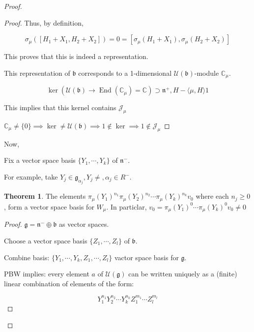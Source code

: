 \documentclass{article}
\theoremstyle{definition}
\newtheorem{theorem}{Theorem}
\begin{document}
\begin{proof}
\begin{proof}
        Thus, by definition,

        \[
            \sigma_\mu ([H_1 + X_1, H_2 + X_2]) = 0 = [\sigma_\mu(H_1 + X_1), \sigma_\mu(H_2 + X_2)]
        \]

        This proves that this is indeed a representation.

        This representation of \(\mathfrak{b}\) corresponds to a 1-dimensional \(\mathcal{U}(\mathfrak{b})\)-module \(\mathbb{C}_\mu\).
        
        \[
            \ker(\mathcal{U}(\mathfrak{b}) \to \operatorname{End}(\mathbb{C}_\mu) = \mathbb{C}) \supset \mathfrak{n}^+, H - \langle \mu , H \rangle 1 
        \]

        This implies that this kernel contains \(\mathcal{J}_\mu\)
        
        \(\mathbb{C}_\mu \neq \{ 0 \} \implies \ker \neq \mathcal{U}(\mathfrak{b}) \implies 1\notin \ker \implies 1\notin \mathcal{J}_\mu\) 

    \end{proof}

    Now,

    Fix a vector space basis \(\{ Y_1, \cdots, Y_k \} \) of \(\mathfrak{n}^-\).

    For example, take \(Y_j \in \mathfrak{g}_{\alpha_j}, Y_j \neq, \alpha_j\in R^-\).

    \begin{theorem}
        The elements \(\pi_\mu(Y_1)^{n_1}\pi_\mu(Y_2)^{n_2}\cdots\pi_\mu (Y_k)^{n_k}v_0\) where each \(n_j \geq 0\), form a vector space basis for \(W_\mu\). In particlar, \(v_0 = \pi_\mu(Y_1)^0\cdots\pi_\mu(Y_k)^{0}v_0 \neq 0\)    
    \end{theorem}

    \begin{proof}
        \(\mathfrak{g} = \mathfrak{n}^- \oplus \mathfrak{b}\) as vector spaces.
        
        Choose a vector space basis \(\{ Z_1, \cdots, Z_l \}\) of \(\mathfrak{b}\).
        
        Combine basis: \(\{ Y_1,\cdots, Y_k, Z_1,\cdots,Z_l \}\) vactor space basis for \(\mathfrak{g}\).
        
        PBW implies: every element \(a\) of \(\mathcal{U}(\mathfrak{g})\) can be written uniquely as a (finite) linear combination of elements of the form:
        
        \[
            Y_1 ^{n_1} Y_2 ^{n_2}\cdots Y_k^{n_k} Z_1^{m_1}\cdots Z_l^{m_l}
        \]


\end{proof}
\end{proof}
\end{document}
